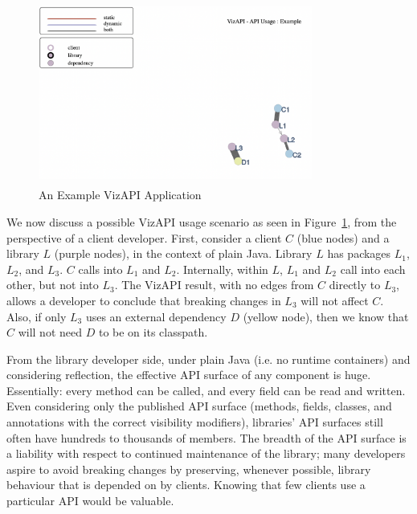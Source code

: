 \begin{figure}[h]
\begin{center}
\includegraphics[scale=1,width=9cm,height=6cm]{images/intro-example.png}
\caption{An Example VizAPI Application}
\label{fig:example}
\end{center}
\end{figure}


We now discuss a possible VizAPI usage scenario as seen in Figure~\ref{fig:example}, from the perspective of a client developer. First, consider a client $C$ (blue nodes) and a library $L$ (purple nodes), in the context of plain Java. Library $L$ has packages $L_1$, $L_2$, and $L_3$. $C$ calls into $L_1$ and $L_2$. Internally, within $L$, $L_1$ and $L_2$ call into each other, but not into $L_3$. The VizAPI result, with no edges from $C$ directly to $L_3$, allows a developer to conclude that breaking changes in $L_3$ will not affect $C$. Also, if only $L_3$ uses an external dependency $D$ (yellow node), then we know that $C$ will not need $D$ to be on its classpath.

From the library developer side, under plain Java (i.e. no runtime containers) and considering reflection, the effective API surface of any component is huge. Essentially: every method can be called, and every field can be read and written. Even considering only the published API surface (methods, fields, classes, and annotations with the correct visibility modifiers), libraries' API surfaces still often have hundreds to thousands of members. The breadth of the API surface is a liability with respect to continued maintenance of the library; many developers aspire to avoid breaking changes by preserving, whenever possible, library behaviour that is depended on by clients. Knowing that few clients use a particular API would be valuable.

